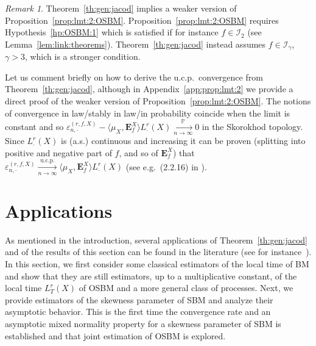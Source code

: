 \documentclass[12pt]{article}
\numberwithin{equation}{section}
\theoremstyle{definition}
\theoremstyle{remark}
\newtheorem{remark}{Remark}
\newcommand{\convp}[1][]{\xrightarrow[#1]{\PP}}
\newcommand{\convucp}[1][]{\xrightarrow[#1]{\mathrm{u.c.p.}}}
\newcommand{\PP}{\mathbb{P}}
\newcommand{\Lg}[1]{\mathcal{I}_{#1}}
\newcommand{\bfF}[1]{\mathbf{E}^X_{#1}}
\begin{document}
\begin{remark} \label{comment:convergence}
Theorem~\ref{th:gen:jacod} implies a weaker version of Proposition~\ref{prop:lmt:2:OSBM}.
Proposition~\ref{prop:lmt:2:OSBM} requires Hypothesis~\ref{hp:OSBM:1} which is satisfied if for instance $f \in \Lg{2}$ (see Lemma~\ref{lem:link:theorems}). 
Theorem~\ref{th:gen:jacod} instead assumes $f\in \Lg{\gamma}$, $\gamma > 3$, which is a stronger condition.

Let us comment briefly on how to derive the u.c.p.~convergence from Theorem~\ref{th:gen:jacod}, 
although in Appendix~\ref{app:prop:lmt:2} we provide a direct proof of the weaker version of Proposition~\ref{prop:lmt:2:OSBM}.
The notions of convergence in law/stably in law/in probability coincide when the limit is constant and so  
$
	\varepsilon_{n,\cdot}^{(r,f,X)} -  \langle \mu_X , \bfF{f} \rangle L^r_\cdot(X) \convp[n\to\infty] 0
$
in the Skorokhod topology.
Since $L^r_\cdot(X)$ is (a.s.) continuous and increasing
it can be proven (splitting into positive and negative part of $f$, and so of $\bfF{f}$)
that 
$
	\varepsilon_{n,\cdot}^{(r,f,X)} \convucp[n\to\infty]  \langle \mu_X , \bfF{f} \rangle L^r_\cdot(X)
$
(see e.g.~(2.2.16) in \cite{jp}).
%
\end{remark}









\section{Applications} \label{sec:applications:base}

As mentioned in the introduction, several applications of Theorem~\ref{th:gen:jacod} and of the results of this section can be found in the literature (see for instance~\cite{lmt1,lmt,lm23,robert_2023}).
In this section, we first consider some classical estimators of the local time of BM and show that they are still estimators, up to a multiplicative constant, of the local time $L_T^r(X)$ of OSBM and a more general class of processes. Next, we provide estimators of the skewness parameter of SBM and analyze their asymptotic behavior.
This is the first time the convergence rate and an asymptotic mixed normality property for a skewness parameter of SBM is established and that joint estimation of OSBM is explored.
\end{document}
